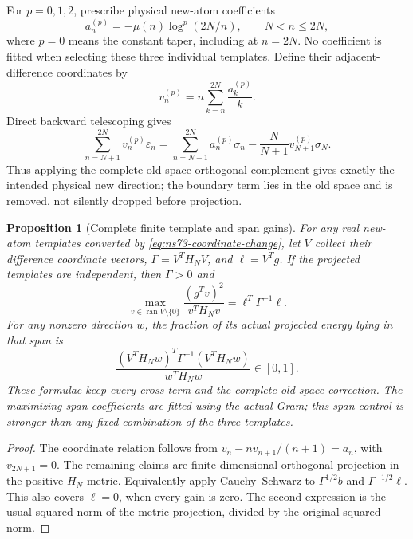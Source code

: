 \documentclass[11pt]{article}
\newtheorem{proposition}[theorem]{Proposition}
\theoremstyle{remark}
\begin{document}
For $p=0,1,2$, prescribe physical new-atom coefficients
\[
 a^{(p)}_n=-\mu(n)\log^p(2N/n),\qquad N<n\leq2N,
\]
where $p=0$ means the constant taper, including at $n=2N$.
No coefficient is fitted when selecting these three individual templates.
Define their adjacent-difference coordinates by
\begin{equation}
 v^{(p)}_n=n\sum_{k=n}^{2N}\frac{a^{(p)}_k}{k}.
 \label{eq:ns73-coordinate-change}
\end{equation}
Direct backward telescoping gives
\[
 \sum_{n=N+1}^{2N}v^{(p)}_n\varepsilon_n
 =\sum_{n=N+1}^{2N}a^{(p)}_n\sigma_n
                  -\frac{N}{N+1}v^{(p)}_{N+1}\sigma_N.
\]
Thus applying the complete old-space orthogonal complement gives exactly
the intended physical new direction; the boundary term lies in the old
space and is removed, not silently dropped before projection.

\begin{proposition}[Complete finite template and span gains]
\label{prop:ns73-span}
For any real new-atom templates converted by
\eqref{eq:ns73-coordinate-change}, let $V$ collect their difference
coordinate vectors, $\Gamma=V^TH_NV$, and $\ell=V^Tg$.
If the projected templates are independent, then $\Gamma>0$ and
\[
 \max_{v\in\operatorname{ran}V\setminus\{0\}}
       \frac{(g^Tv)^2}{v^TH_Nv}=\ell^T\Gamma^{-1}\ell.
\]
For any nonzero direction $w$, the fraction of its actual projected
energy lying in that span is
\[
 \frac{(V^TH_Nw)^T\Gamma^{-1}(V^TH_Nw)}{w^TH_Nw}\in[0,1].
\]
These formulae keep every cross term and the complete old-space correction.
The maximizing span coefficients are fitted using the actual Gram; this
span control is stronger than any fixed combination of the three templates.
\end{proposition}
\begin{proof}
The coordinate relation follows from
$v_n-nv_{n+1}/(n+1)=a_n$, with $v_{2N+1}=0$.
The remaining claims are finite-dimensional orthogonal projection in the
positive $H_N$ metric. Equivalently apply Cauchy--Schwarz to
$\Gamma^{1/2}b$ and $\Gamma^{-1/2}\ell$. This also covers $\ell=0$,
when every gain is zero. The second expression is the usual squared norm
of the metric projection, divided by the original squared norm.
\end{proof}
\end{document}

